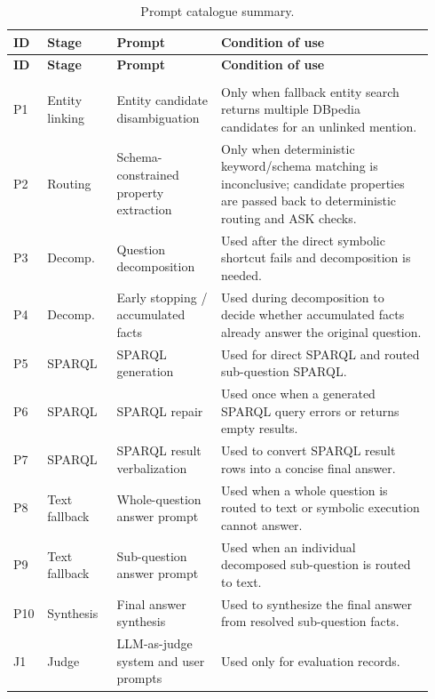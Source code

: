 \documentclass[11pt]{article}
\begin{document}
\begingroup
\scriptsize
\sffamily
\setlength{\tabcolsep}{2pt}
\renewcommand{\arraystretch}{1.08}
\begin{longtable}{@{}>{\raggedright\arraybackslash}p{0.055\linewidth}
                  >{\raggedright\arraybackslash}p{0.16\linewidth}
                  >{\raggedright\arraybackslash}p{0.24\linewidth}
                  >{\raggedright\arraybackslash}p{0.49\linewidth}@{}}
\caption{Prompt catalogue summary.}
\label{tab:prompt-catalog}\\
\toprule
\rowcolor{PromptHeader}
\textbf{ID} & \textbf{Stage} & \textbf{Prompt} &
\textbf{Condition of use} \\
\midrule
\endfirsthead
\toprule
\rowcolor{PromptHeader}
\textbf{ID} & \textbf{Stage} & \textbf{Prompt} &
\textbf{Condition of use} \\
\midrule
\endhead
\midrule
\multicolumn{4}{r@{}}{\emph{continued on next page}}\\
\endfoot
\bottomrule
\endlastfoot
P1 & Entity linking & Entity candidate disambiguation &
Only when fallback entity search returns multiple DBpedia candidates for an
unlinked mention. \\
P2 & Routing & Schema-constrained property extraction &
Only when deterministic keyword/schema matching is inconclusive; candidate
properties are passed back to deterministic routing and ASK checks. \\
P3 & Decomp. & Question decomposition &
Used after the direct symbolic shortcut fails and decomposition is needed. \\
P4 & Decomp. & Early stopping / accumulated facts &
Used during decomposition to decide whether accumulated facts already answer
the original question. \\
P5 & SPARQL & SPARQL generation &
Used for direct SPARQL and routed sub-question SPARQL. \\
P6 & SPARQL & SPARQL repair &
Used once when a generated SPARQL query errors or returns empty results. \\
P7 & SPARQL & SPARQL result verbalization &
Used to convert SPARQL result rows into a concise final answer. \\
P8 & Text fallback & Whole-question answer prompt &
Used when a whole question is routed to text or symbolic execution cannot
answer. \\
P9 & Text fallback & Sub-question answer prompt &
Used when an individual decomposed sub-question is routed to text. \\
P10 & Synthesis & Final answer synthesis &
Used to synthesize the final answer from resolved sub-question facts. \\
J1 & Judge & LLM-as-judge system and user prompts &
Used only for evaluation records. \\
\end{longtable}
\endgroup
\end{document}
